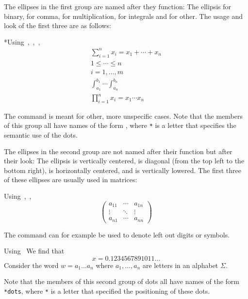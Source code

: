 The ellipses in the first group are named after they function:
The ellipsis  for binary,  for comma,  for multiplication,  for integrals and  for other.
The usage and look of the first three are as follows:
\begin{showlatex}*{Using~,~,~,~}
\begin{gather*}
  \sum_{i=1}^n x_i
  =
  x_1 + \dotsb + x_n 
  \\
  1 \leq \dotsb \leq n 
  \\
  i = 1, \dotsc, m
  \\
  \int_{a_1}^{b_1}
  \dotsi
  \int_{a_n}^{b_n}
  \\
  \prod_{i=1}^n x_i
  =
  x_1 \dotsm x_n
\end{gather*}
\end{showlatex}
The command  is meant for other, more unspecific cases.
Note that the members of this group all have names of the form , where \texttt{*} is a letter that specifies the semantic use of the dots.

The ellipses in the second group are not named after their function but after their look:
The ellipsis  is vertically centered,  is diagonal (from the top left to the bottom right),  is horizontally centered, and  is vertically lowered.
The first three of these ellipses are usually used in matrices:
\begin{showlatex}{Using~,~,~}
\[
  \begin{pmatrix}
    a_{11} & \cdots & a_{1n} \\
    \vdots & \ddots & \vdots \\
    a_{n1} & \cdots & a_{nn}
  \end{pmatrix}
\]
\end{showlatex}
The command  can for example be used to denote left out digits or symbols.
\begin{showlatex}{Using~}
We find that
\[
  x = 0.1234567891011\ldots
\]
Consider the word $w = a_1 \ldots a_n$ where $a_1, \dotsc, a_n$ are letters in an alphabet $\Sigma$.
\end{showlatex}
Note that the members of this second group of dots all have names of the form \texttt{*dots}, where \texttt{*} is a letter that specified the positioning of these dots.

